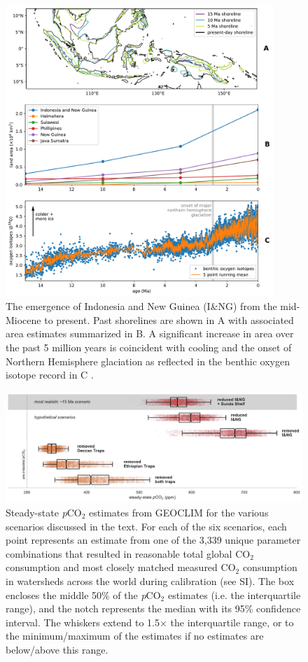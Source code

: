 \documentclass[11pt,letterpaper]{article}
\newcommand{\pCOtwo}{\textit{p}CO$_{2}$\xspace}
\newcommand{\COtwo}{CO$_{2}$\xspace}
\begin{document}
\begin{figure}[h!]
    \centering
    \includegraphics[width=0.9\textwidth]{Manuscript/Figures/shoreline_growth.pdf}
    \caption{The emergence of Indonesia and New Guinea (I\&NG) from the mid-Miocene to present. Past shorelines are shown in A with associated area estimates summarized in B. A significant increase in area over the past 5 million years is coincident with cooling and the onset of Northern Hemisphere glaciation as reflected in the benthic oxygen isotope record in C \citep{Zachos2008a}.}
    \label{fig:shoreline_growth}
\end{figure}

\begin{figure}[h!]
    \centering
    \includegraphics[width=1\textwidth]{Manuscript/Figures/scenario_pCO2.pdf}
    \caption{Steady-state \pCOtwo estimates from GEOCLIM for the various scenarios discussed in the text. For each of the six scenarios, each point represents an estimate from one of the 3,339 unique parameter combinations that resulted in reasonable total global \COtwo consumption and most closely matched measured \COtwo consumption in watersheds across the world during calibration (see SI). The box encloses the middle 50\% of the \pCOtwo estimates (i.e. the interquartile range), and the notch represents the median with its 95\% confidence interval. The whiskers extend to 1.5$\times$ the interquartile range, or to the minimum/maximum of the estimates if no estimates are below/above this range.}
    \label{fig:scenario_pCO2}
\end{figure}

\clearpage
\newpage
\footnotesize

\singlespacing



\end{document}

